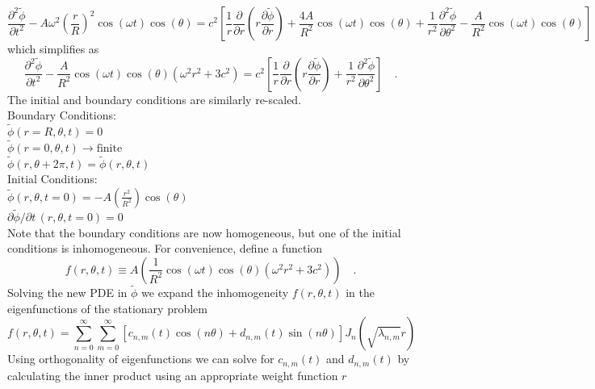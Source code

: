 \documentclass{homework}
\begin{document}
\[ \frac{ \partial^2 \tilde{\phi}}{\partial t^2} - A \omega^2 \left(\frac{r}{R} \right)^2 \cos(\omega t) \cos(\theta) = c^2 \left[ \frac{1}{r} \frac{\partial}{\partial r} (r \frac{\partial \tilde{\phi}}{\partial r}) + \frac{4A}{R^2} \cos(\omega t) \cos(\theta) + \frac{1}{r^2} \frac{\partial^2 \tilde{\phi} }{\partial \theta^2} - \frac{A}{R^2} \cos(\omega t) \cos(\theta) \right]\]
\noindent
which simplifies as
\[ \frac{ \partial^2 \tilde{\phi}}{\partial t^2} - \frac{A}{R^2} \cos(\omega t) \cos(\theta) (\omega^2 r^2 + 3c^2) = c^2 \left[ \frac{1}{r} \frac{\partial}{\partial r} (r \frac{\partial \tilde{\phi}}{\partial r}) + \frac{1}{r^2} \frac{\partial^2 \tilde{\phi} }{\partial \theta^2} \right] \quad .\]
\noindent The initial and boundary conditions are similarly re-scaled.
\\ [8pt]
\noindent Boundary Conditions: \\
$ \tilde{\phi}(r=R, \theta, t) = 0 $ \\
$ \tilde{\phi}(r=0, \theta, t) \rightarrow \textrm{finite} $ \\
$ \tilde{\phi}(r, \theta + 2\pi, t) = \tilde{\phi}(r, \theta, t) $ \\ [8pt]
\noindent Initial Conditions: \\
$ \tilde{\phi}(r, \theta, t=0) = - A \left( \frac{r^2}{R^2} \right) \cos(\theta) $ \\
$ \partial \tilde{\phi}/ \partial t \, (r, \theta, t=0) = 0 $ \\ [8pt] \noindent
Note that the boundary conditions are now homogeneous, but one of the initial conditions is inhomogeneous. For convenience, define a function
\[ f(r, \theta , t) \equiv A \left( \frac{1}{R^2} \cos(\omega t) \cos(\theta) (\omega^2 r^2 + 3c^2) \right) \quad .\]
\noindent
Solving the new PDE in $\tilde{\phi}$ we expand the inhomogeneity $f(r, \theta , t)$ in the eigenfunctions of the stationary problem
\[ f(r, \theta , t) = \sum^\infty_{n=0} \sum^\infty_{m=0} [c_{n,m}(t) \cos(n \theta) + d_{n,m}(t) \sin(n \theta) ] J_n (\sqrt{\lambda_{n,m}} r) \]
\noindent
Using orthogonality of eigenfunctions we can solve for $c_{n,m}(t)$ and $d_{n,m}(t)$ by calculating the inner product using an appropriate weight function $r$
\end{document}

